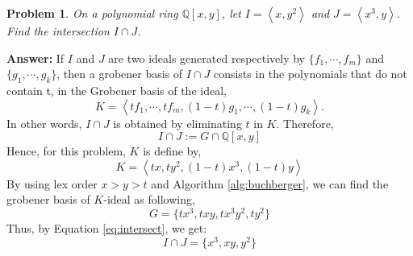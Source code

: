 \documentclass[a4paper,12pt]{article}
\newtheorem{prob}{Problem}[]
\theoremstyle{definition}
\newcommand{\Q}{\mathbb{Q}}
\begin{document}
\begin{prob}
	On a polynomial ring $\Q[x,y]$, let $I=\left< x,y^2 \right>$ and $J=\left< x^3,y \right>$. Find the intersection $I\cap J$.
\end{prob}
\textbf{Answer:}
If $I$ and $J$ are two ideals generated respectively by $\{f_1, \cdots, f_m\}$ and $\{g_1, \cdots, g_k\}$, then a grobener basis of $I\cap J$ consists in the polynomials that do not contain t, in the Grobener basis of the ideal,
\begin{equation*}
K = \left< tf_1,\cdots,tf_m, (1-t)g_1,\cdots,(1-t)g_k \right>.
\end{equation*}
In other words, $I\cap J$ is obtained by eliminating $t$ in $K$. Therefore,
\begin{equation}\label{eq:intersect}
I\cap J := G \cap \Q[x,y]
\end{equation}
Hence, for this problem, $K$ is define by,
\begin{equation*}
K = \left< tx,ty^2, (1-t)x^3,(1-t)y \right>
\end{equation*}
By using lex order $x>y>t$ and Algorithm \ref{alg:buchberger}, we can find the grobener basis of $K$-ideal as following,
\begin{equation*}
G = \{ tx^3, txy, tx^3y^2, ty^2 \}
\end{equation*}
Thus, by Equation \eqref{eq:intersect}, we get:
\begin{equation*}
I\cap J = \{x^3, xy, y^2\}
\end{equation*}
\end{document}
